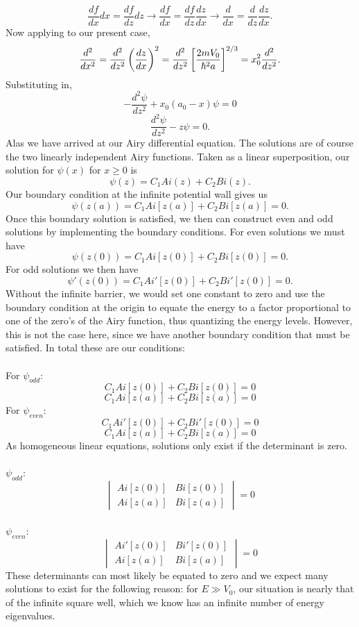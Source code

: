 \documentclass[11pt,letterpaper]{article}
\begin{document}
\begin{enumerate}
\begin{enumerate}
$$\frac{df}{dx}dx = \frac{df}{dz}dz\to\frac{df}{dx} = \frac{df}{dz}\frac{dz}{dx}\to\frac{d}{dx} = \frac{d}{dz}\frac{dz}{dx}.$$
Now applying to our present case,
$$\frac{d^2}{dx^2} = \frac{d^2}{dz^2}\left(\frac{dz}{dx}\right)^2 = \frac{d^2}{dz^2}\left[\frac{2mV_0}{\hbar^2a}\right]^{2/3}=x_0^2\frac{d^2}{dz^2}.$$
Substituting in, 
$$-\frac{d^2\psi}{dz^2}+x_0(a_0-x)\psi = 0 $$
$$\frac{d^2\psi}{dz^2}-z\psi = 0.$$
Alas we have arrived at our Airy differential equation. The solutions are of course the two linearly independent Airy functions. Taken as a linear superposition, our solution for $\psi(x)$ for $x\ge0$ is
$$\psi(z) = C_1Ai(z)+C_2Bi(z).$$
Our boundary condition at the infinite potential wall gives us
$$\psi(z(a)) = C_1Ai[z(a)]+C_2Bi[z(a)] = 0.$$
Once this boundary solution is satisfied, we then can construct even and odd solutions by implementing the boundary conditions. For even solutions we must have
$$\psi(z(0)) = C_1Ai[z(0)]+C_2Bi[z(0)]= 0.$$
For odd solutions we then have
$$\psi'(z(0)) = C_1Ai'[z(0)]+C_2Bi'[z(0)]= 0.$$
Without the infinite barrier, we would set one constant to zero and use the boundary condition at the origin to equate the energy to a factor proportional to one of the zero's of the Airy function, thus quantizing the energy levels. However, this is not the case here, since we have another boundary condition that must be satisfied. In total these are our conditions:
\\ \\For $\psi_{odd}$:
$$C_1Ai[z(0)]+C_2Bi[z(0)] = 0$$
$$C_1Ai[z(a)]+C_2Bi[z(a)] = 0$$
For $\psi_{even}$:
$$C_1Ai'[z(0)]+C_2Bi'[z(0)]= 0$$
$$C_1Ai[z(a)]+C_2Bi[z(a)] = 0$$
As homogeneous linear equations, solutions only exist if the determinant is zero.
\\ \\$\psi_{odd}:$
$$\begin{vmatrix}Ai[z(0)]&Bi[z(0)]\\Ai[z(a)]&Bi[z(a)]
\end{vmatrix}=0$$
\\$\psi_{even}:$
$$\begin{vmatrix}Ai'[z(0)]&Bi'[z(0)]\\Ai[z(a)]&Bi[z(a)]
\end{vmatrix}=0$$
These determinants can most likely be equated to zero and we expect many solutions to exist for the following reason: for $E\gg V_0$, our situation is nearly that of the infinite square well, which we know has an infinite number of energy eigenvalues. 
\\ \\

\end{enumerate}
\end{enumerate}
\end{document}
